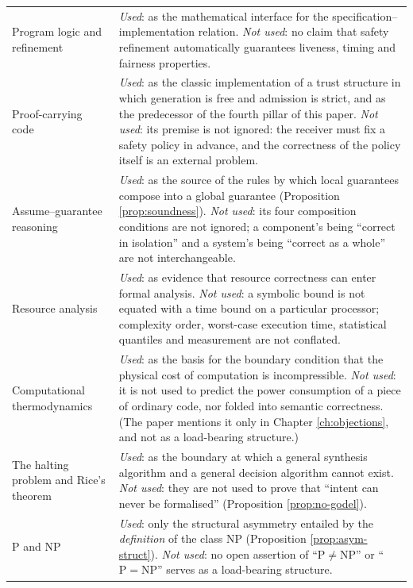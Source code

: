 \begin{longtable}{L{3.6cm}L{10.8cm}}
Program logic and refinement &
  \emph{Used}: as the mathematical interface for the specification--implementation
  relation.
  \emph{Not used}: no claim that safety refinement automatically guarantees liveness,
  timing and fairness properties. \\
Proof-carrying code &
  \emph{Used}: as the classic implementation of a trust structure in which generation is
  free and admission is strict, and as the predecessor of the fourth pillar of this paper.
  \emph{Not used}: its premise is not ignored: the receiver must fix a safety policy in
  advance, and the correctness of the policy itself is an external problem. \\
Assume--guarantee reasoning &
  \emph{Used}: as the source of the rules by which local guarantees compose into a global
  guarantee (Proposition \ref{prop:soundness}).
  \emph{Not used}: its four composition conditions are not ignored; a component's being
  ``correct in isolation'' and a system's being ``correct as a whole'' are not
  interchangeable. \\
Resource analysis &
  \emph{Used}: as evidence that resource correctness can enter formal analysis.
  \emph{Not used}: a symbolic bound is not equated with a time bound on a particular
  processor; complexity order, worst-case execution time, statistical quantiles and
  measurement are not conflated. \\
Computational thermodynamics &
  \emph{Used}: as the basis for the boundary condition that the physical cost of computation
  is incompressible.
  \emph{Not used}: it is not used to predict the power consumption of a piece of ordinary
  code, nor folded into semantic correctness.
  (The paper mentions it only in Chapter \ref{ch:objections}, and not as a load-bearing
  structure.) \\
The halting problem and Rice's theorem &
  \emph{Used}: as the boundary at which a general synthesis algorithm and a general decision
  algorithm cannot exist.
  \emph{Not used}: they are not used to prove that ``intent can never be formalised''
  (Proposition \ref{prop:no-godel}). \\
$\mathrm{P}$ and $\mathrm{NP}$ &
  \emph{Used}: only the structural asymmetry entailed by the \emph{definition} of the class
  $\mathrm{NP}$ (Proposition \ref{prop:asym-struct}).
  \emph{Not used}: no open assertion of ``$\mathrm{P} \neq \mathrm{NP}$'' or
  ``$\mathrm{P} = \mathrm{NP}$'' serves as a load-bearing structure. \\
\bottomrule
\end{longtable}

